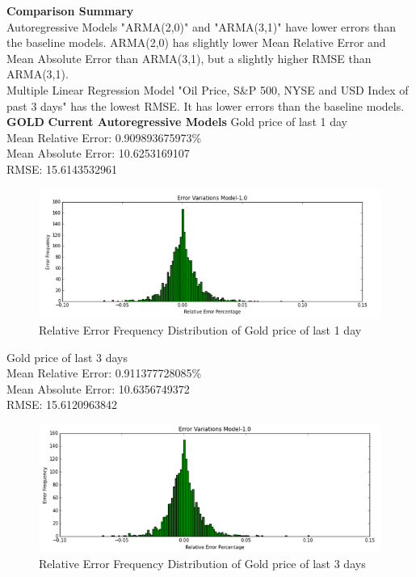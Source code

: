 \documentclass[runningheads]{llncs}
\begin{document}
\noindent\textbf{Comparison Summary} \\
Autoregressive Models "ARMA(2,0)" and "ARMA(3,1)" have lower errors than the baseline models. ARMA(2,0) has slightly lower Mean Relative Error and Mean Absolute Error than ARMA(3,1), but a slightly higher RMSE than ARMA(3,1). \\
Multiple Linear Regression Model "Oil Price, S\&P 500, NYSE and USD Index of past 3 days" has the lowest RMSE. 
It has lower errors than the baseline models. \\

\noindent\textbf{GOLD}
\noindent\textbf{Current Autoregressive Models}
Gold price of last 1 day\\
Mean Relative Error: 0.909893675973\% \\
Mean Absolute Error:  10.6253169107 \\
RMSE:  15.6143532961 \\
\begin{figure}
\centering
\includegraphics[width=\textwidth]{GoldLast1_Daily.png}
\caption{Relative Error Frequency Distribution of Gold price of last 1 day}
\label{fig:GoldLast1_Daily.png}
\end{figure}

\noindent Gold price of last 3 days \\
Mean Relative Error: 0.911377728085\% \\
Mean Absolute Error:  10.6356749372 \\
RMSE: 15.6120963842 \\
\begin{figure}
\centering
\includegraphics[width=\textwidth]{GoldLast3_Daily.png}
\caption{Relative Error Frequency Distribution of Gold price of last 3 days}
\label{fig:GoldLast3_Daily.png}
\end{figure}
\end{document}
